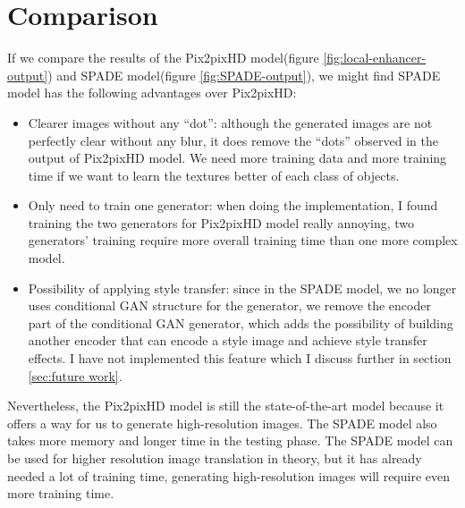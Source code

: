 \section{Comparison}
If we compare the results of the Pix2pixHD model(figure \ref{fig:local-enhancer-output}) and 
SPADE model(figure \ref{fig:SPADE-output}), we might find SPADE model has the following 
advantages over Pix2pixHD: 
\begin{itemize}
    \item Clearer images without any “dot”: although the generated images are not perfectly 
    clear without any blur, it does remove the “dots” observed in the output of Pix2pixHD 
    model. We need more training data and more training time if we want to learn the textures 
    better of each class of objects.
    \item Only need to train one generator: when doing the implementation, I found training the 
    two generators for Pix2pixHD model really annoying, two generators' training require more 
    overall training time than one more complex model.
    \item Possibility of applying style transfer: since in the SPADE model, we no longer uses 
    conditional GAN structure for the generator, we remove the encoder part of the conditional 
    GAN generator, which adds the possibility of building another encoder that can encode a 
    style image and achieve style transfer effects. I have not implemented this feature which I 
    discuss further in section \ref{sec:future work}.
\end{itemize}

Nevertheless, the Pix2pixHD model is still the state-of-the-art model because it offers a way for 
us to generate high-resolution images. The SPADE model also takes more memory and longer time 
in the testing phase. The SPADE model can be used for higher resolution image 
translation in theory, but it has already needed a lot of training time, generating high-resolution 
images will require even more training time. 
